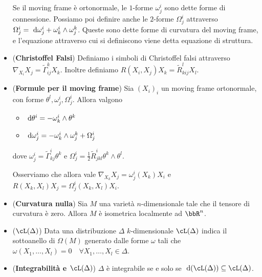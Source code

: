 \documentclass[a4paper,NoNotes,GeneralMath]{stdmdoc}
\begin{document}
\begin{itemize}
  Se il moving frame è ortonormale, le $1$-forme $\omega^i_j$ sono dette forme di connessione.
  Possiamo poi definire anche le $2$-forme $\Omega^i_j$ attraverso $\Omega^i_j = \de \omega^i_j + \omega^i_k \wedge \omega^k_j$. Queste sono dette forme di curvatura del moving frame, e l'equazione attraverso cui si definiscono viene detta equazione di struttura.
\item ({\bf Christoffel Falsi}) Definiamo i simboli di Christoffel falsi attraverso $\nabla_{X_i} X_j = \widetilde\Gamma_{ij}^k X_k$. Inoltre definiamo $R(X_i, X_j) X_k = \widetilde R_{kij}^l X_l$.
\item ({\bf Formule per il moving frame}) Sia $(X_i)_i$ un moving frame ortonormale, con forme $\theta^l, \omega^i_j, \Omega^i_j$. Allora valgono
  \begin{itemize}
  \item $\de \theta^i = -\omega^i_k \wedge \theta^k$
  \item $\de \omega^i_j = - \omega^i_k \wedge \omega^k_j + \Omega^i_j$
  \end{itemize}
  dove $\omega^i_j = \widetilde\Gamma_{kj}^i \theta^k$ e $\Omega^i_j = \frac{1}{2} \widetilde R_{jkl}^i \theta^k \wedge \theta^l$.

  Osserviamo che allora vale $\nabla_{X_k} X_j = \omega^i_j (X_k) X_i$ e $R(X_k, X_l) X_j = \Omega^i_j (X_k, X_l) X_i$.
\item ({\bf Curvatura nulla}) Sia $M$ una varietà $n$-dimensionale tale che il tensore di curvatura è zero. Allora $M$ è isometrica localmente ad $\bbR^n$.
\item ({\bf $\cL(\Delta)$}) Data una distribuzione $\Delta$ $k$-dimensionale $\cL(\Delta)$ indica il sottoanello di $\Omega(M)$ generato dalle forme $\omega$ tali che $\omega(X_1, \ldots, X_l) = 0 \quad \forall X_1, \ldots, X_l \in \Delta$.
\item ({\bf Integrabilità e $\cL(\Delta)$}) $\Delta$ è integrabile se e solo se $\de (\cL(\Delta)) \subseteq \cL(\Delta)$.
\end{itemize}
\end{document}
